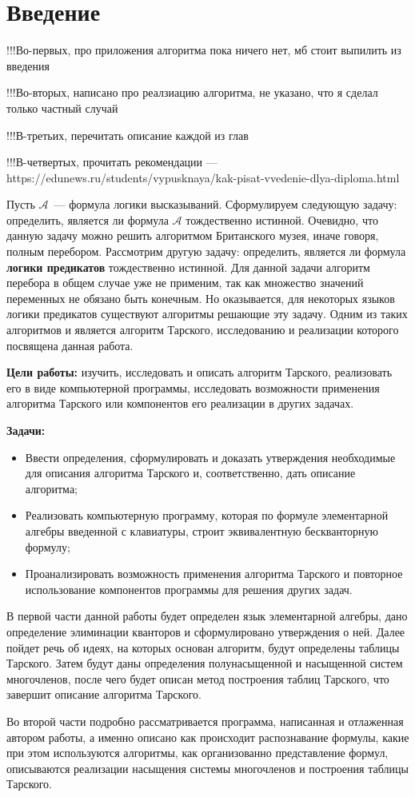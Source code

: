 \section*{Введение}

!!!Во-первых, про приложения алгоритма пока ничего нет, мб стоит выпилить из введения

!!!Во-вторых, написано про реалзиацию алгоритма, не указано, что я сделал только частный случай

!!!В-третьих, перечитать описание каждой из глав

!!!В-четвертых, прочитать рекомендации --- https://edunews.ru/students/vypusknaya/kak-pisat-vvedenie-dlya-diploma.html

Пусть $\mathcal{A}$~--- формула логики высказываний. 
Сформулируем следующую задачу: определить, является ли формула $\mathcal{A}$ тождественно истинной. 
Очевидно, что данную задачу можно решить алгоритмом Британского музея, иначе говоря, полным перебором.
Рассмотрим другую задачу: определить, является ли формула \textbf{логики предикатов} тождественно истинной. 
Для данной задачи алгоритм перебора в общем случае уже не применим, так как множество значений переменных не обязано быть конечным. Но оказывается, для некоторых языков логики предикатов существуют алгоритмы решающие эту задачу. Одним из таких алгоритмов и является алгоритм Тарского, исследованию и реализации которого посвящена данная работа.

\textbf{Цели работы:} изучить, исследовать и описать алгоритм Тарского, реализовать его в виде компьютерной программы, исследовать возможности применения алгоритма Тарского или компонентов его реализации в других задачах.

\textbf{Задачи:}
\begin{itemize}
	\item Ввести определения, сформулировать и доказать утверждения необходимые для описания алгоритма Тарского и, соответственно, дать описание алгоритма;
	\item Реализовать компьютерную программу, которая по формуле элементарной алгебры введенной с клавиатуры, строит эквивалентную бескванторную формулу;
	\item Проанализировать возможность применения алгоритма Тарского и повторное использование компонентов программы для решения других задач. 
\end{itemize}

В первой части данной работы будет определен язык элементарной алгебры, дано определение элиминации кванторов и сформулировано утверждения о ней. Далее пойдет речь об идеях, на которых основан алгоритм, будут определены таблицы Тарского. Затем будут даны определения полунасыщенной и насыщенной систем многочленов, после чего будет описан метод построения таблиц Тарского, что завершит описание алгоритма Тарского.

Во второй части подробно рассматривается программа, написанная и отлаженная автором работы, а именно описано как происходит распознавание формулы, какие при этом используются алгоритмы, как организованно представление формул, описываются реализации насыщения системы многочленов и построения таблицы Тарского. 
